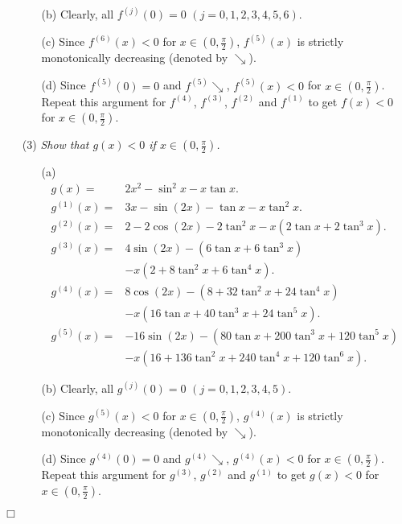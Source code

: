 \documentclass{article}
\begin{document}
\begin{enumerate}
\begin{enumerate}
    \item[(b)]
      Clearly, all $f^{(j)}(0) = 0$ $(j=0,1,2,3,4,5,6)$.

    \item[(c)]
      Since $f^{(6)}(x) < 0$ for $x \in (0, \frac{\pi}{2})$,
      $f^{(5)}(x)$ is strictly monotonically decreasing (denoted by $\searrow$).

    \item[(d)]
      Since $f^{(5)}(0) = 0$ and $f^{(5)} \searrow$,
      $f^{(5)}(x) < 0$ for $x \in (0, \frac{\pi}{2})$.
      Repeat this argument for $f^{(4)}$, $f^{(3)}$, $f^{(2)}$ and $f^{(1)}$
      to get $f(x) < 0$ for $x \in (0, \frac{\pi}{2})$.
  \end{enumerate}

\item[(3)]
\emph{Show that $g(x) < 0$ if $x \in (0, \frac{\pi}{2})$.}
  \begin{enumerate}
    \item[(a)]
      \begin{align*}
        g(x) =& 2x^2 - \sin^2 x - x \tan x. \\
        g^{(1)}(x) =& 3x - \sin(2x) - \tan x - x\tan^2 x. \\
        g^{(2)}(x) =& 2 - 2\cos(2x) - 2 \tan^2 x - x(2 \tan x + 2\tan^3 x). \\
        g^{(3)}(x) =& 4\sin(2x) - (6\tan x + 6\tan^3 x) \\
          &- x(2 + 8 \tan^2 x + 6\tan^4 x). \\
        g^{(4)}(x) =& 8\cos(2x) - (8 + 32 \tan^2 x + 24\tan^4 x) \\
          &- x(16\tan x + 40 \tan^3 x + 24 \tan^5 x). \\
        g^{(5)}(x) =& -16\sin(2x) - (80 \tan x + 200\tan^3 x + 120\tan^5 x) \\
          &- x(16 + 136\tan^2 x + 240 \tan^4 x + 120 \tan^6 x).
      \end{align*}

    \item[(b)]
      Clearly, all $g^{(j)}(0) = 0$ $(j=0,1,2,3,4,5)$.

    \item[(c)]
      Since $g^{(5)}(x) < 0$ for $x \in (0, \frac{\pi}{2})$,
      $g^{(4)}(x)$ is strictly monotonically decreasing (denoted by $\searrow$).

    \item[(d)]
      Since $g^{(4)}(0) = 0$ and $g^{(4)} \searrow$,
      $g^{(4)}(x) < 0$ for $x \in (0, \frac{\pi}{2})$.
      Repeat this argument for $g^{(3)}$, $g^{(2)}$ and $g^{(1)}$
      to get $g(x) < 0$ for $x \in (0, \frac{\pi}{2})$.
  \end{enumerate}
\end{enumerate}
$\Box$ \\\\
\end{document}
